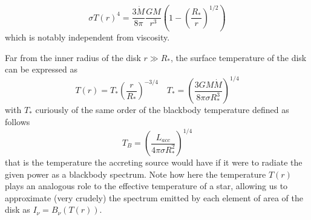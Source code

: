 \begin{equation}
    \sigma T(r)^{4} =  \frac{3\dot{M}}{8\pi}\frac{GM}{r^{3}}\left(1-\left(\frac{R_{*}}{r}\right)^{1/2}\right)
    \label{eq:disk_surface_temp}
\end{equation}
which is notably independent from viscosity.
\par Far from the inner radius of the disk $r \gg R_{*}$, the surface temperature of the disk can be expressed as 
\begin{equation*}
    T(r) = T_{*}\left(\frac{r}{R_{*}}\right)^{-3/4} \quad T_{*} = \left(\frac{3GM\dot{M}}{8\pi\sigma R_{*}^{3}}\right)^{1/4}
\end{equation*}
with $T_{*}$ curiously of the same order of the blackbody temperature defined as follows 
\begin{equation*}
    T_{B} = \left(\frac{L_{acc}}{4\pi\sigma R_{*}^{2}}\right)^{1/4}
\end{equation*}
that is the temperature the accreting source would have if it were to radiate the given power as a blackbody spectrum. Note how here the temperature $T(r)$ plays an analogous role to the effective temperature of a star, allowing us to approximate (very crudely) the spectrum emitted by each element of area of the disk as $I_{\nu} = B_{\nu}(T(r))$.
